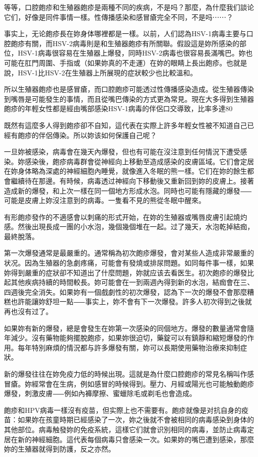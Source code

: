 \documentclass[12pt,UTF8]{ctexbook}
\begin{document}
等等，口腔皰疹和生殖器皰疹是兩種不同的疾病，不是吗？那麼，為什麼我们談论它们，好像是同件事情一樣。性傳播感染和感冒瘡完全不同，不是吗⋯⋯？

事实上，无论皰疹長在妳身体哪裡都是一樣。以前，人们認為HSV-1病毒主要与口腔皰疹有關，而HSV-2病毒則是和生殖器皰疹有所關聯。假設這是妳所感染的部位，HSV-1病毒很容易在生殖器上爆發，同時HSV-2病毒也很容易長滿嘴巴。妳也可能在肛門周圍、手指或（如果妳真的不走運）在妳的眼睛上長出皰疹。也就是說，HSV-1比HSV-2在生殖器上所展現的症狀較少也比較溫和。

所以生殖器皰疹也是感冒瘡，而口腔皰疹可能透过性傳播感染造成。從生殖器傳染到嘴唇是可能發生的事情，而且從嘴巴傳染的方式更為常見。現在大多得到生殖器皰疹的年輕女性都是經由嘴部感染HSV-1病毒的伴侶口交導致，比率多達80%

既然有這麼多人得到皰疹卻不自知，這代表在实際上許多年輕女性被不知道自己已經有皰疹的伴侶傳染。所以妳该如何保護自己呢？

一旦妳被感染，病毒會在幾天內爆發，但也有可能在沒注意到任何情況下遭受感染。妳感染後，皰疹病毒群會從神經向上移動至造成感染的皮膚區域。它们會定居在妳身体略為深處的神經細胞內睡覺，就像進入冬眠的熊一樣。它们在妳的餘生都會繼續待在那邊。有時候，病毒透过神經向下移動後又重新回到妳的皮膚上。接著造成新的爆發，和上次一樣在同一個地方形成水泡。同時也可能有隱藏的爆發⸺可能是皮膚上妳沒注意到的病毒。一隻看不見的熊從冬眠中醒來。

有形皰疹發作的不適感會以刺痛的形式开始，在妳的生殖器或嘴唇皮膚引起燒灼感。然後出現長成一團的小水泡，幾個幾個堆在一起。过了幾天，水泡乾掉結痂，最終脫落。

第一次爆發通常是最嚴重的。通常稱為初次皰疹爆發，會对某些人造成非常嚴重的状况。因為生殖器的急劇疼痛，可能會有發燒或排尿問題。如同每件事一樣，如果妳得到嚴重的症狀卻不知道出了什麼問題，妳就应该去看医生。初次皰疹的爆發比起其他疾病持續的時間較長。妳可能會在一到兩週內得到新的水泡，結痂會在三、四週後完全消失。如果妳有一個戲劇性的初次爆發，認為下一次的爆發不會那麼糟糕也許能讓妳舒坦一點⸺事实上，妳不會有下一次爆發。許多人初次得到之後就再也沒有过了。

如果妳有新的爆發，總是會發生在妳第一次感染的同個地方。爆發的數量通常會隨年減少。沒有藥物能夠擺脫皰疹，如果妳很迫切，藥錠可以有鎮靜和縮短爆發的作用。每年特別麻煩的情況都与許多爆發有關，妳可以長期使用藥物治療來抑制症狀。

新的爆發往往在妳免疫力低的時候出現。這就是為什麼口腔皰疹的常見名稱叫作感冒瘡。妳經常會在生病，例如感冒的時候得到。壓力、月經或陽光也可能触動皰疹爆發，刺激皮膚⸺例如內褲摩擦、蜜蠟除毛或剃毛也會造成。

皰疹和HPV病毒一樣沒有疫苗，但实際上也不需要有。皰疹就像是对抗自身的疫苗：如果妳在孩童時期已經感染了一次，妳之後就不會被相同的病毒感染到身体的其他部位。病毒触發妳的免疫系統，這樣它们就會识別相同的病毒，並防止病毒定居在新的神經細胞。這代表每個病毒只會感染一次。如果妳的嘴巴遭到感染，那麼妳的生殖器就得到防護，反之亦然。
\end{document}

